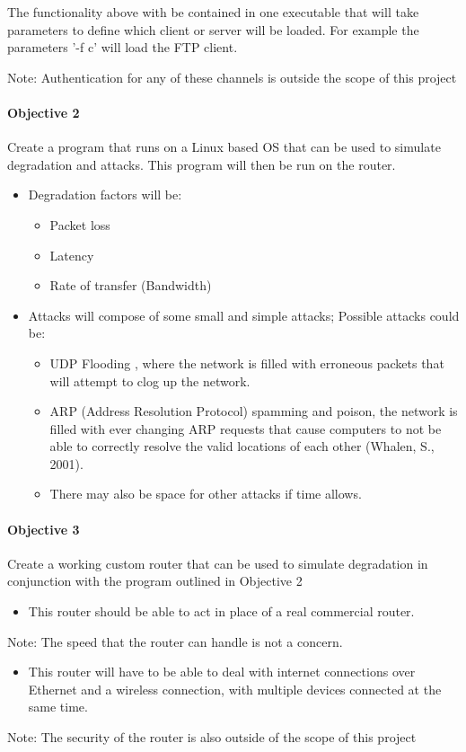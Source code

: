 The functionality above with be contained in one executable that will take parameters to define which client or server will be loaded. For example the parameters '-f c' will load the FTP client.

Note: Authentication for any of these channels is outside the scope of this project

\label{sec:obj2}
\paragraph{Objective 2}
Create a program that runs on a Linux based OS that can be used to simulate degradation and attacks. This program will then be run on the router.

\begin{itemize}
\item Degradation factors will be:
	\begin{itemize}
	\item Packet loss
	\item Latency
	\item Rate of transfer (Bandwidth)
	\end{itemize}
\item Attacks will compose of some small and simple attacks; Possible attacks could be:
	\begin{itemize}
	\item UDP Flooding \citep{xiaoming2010denial}, where the network is filled with erroneous packets that will attempt to clog up the network.
	\item ARP (Address Resolution Protocol) spamming and poison, the network is filled with ever changing ARP requests that cause computers to not be able to correctly resolve the 	valid locations of each other (Whalen, S., 2001).
	\item There may also be space for other attacks if time allows.
	\end{itemize}
\end{itemize}

\paragraph{Objective 3}
Create a working custom router that can be used to simulate degradation in conjunction with the program outlined in Objective 2

\begin{itemize}
\item This router should be able to act in place of a real commercial router. 
\end{itemize}
Note: The speed that the router can handle is not a concern.
\begin{itemize}
\item This router will have to be able to deal with internet connections over Ethernet and a wireless connection, with multiple devices connected at the same time.
\end{itemize}
Note: The security of the router is also outside of the scope of this project


